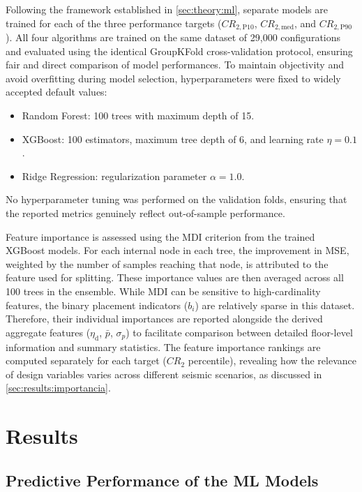 \documentclass[preprint,12pt,authoryear]{elsarticle}
\newcommand{\CR}[1]{CR_{2,\text{#1}}}
\newcommand{\etad}{\eta_{\mathrm{d}}}
\begin{document}
Following the framework established in \cref{sec:theory:ml}, separate models are trained for each of the three performance targets ($\CR{P10}$, $\CR{med}$, and $\CR{P90}$). All four algorithms are trained on the same dataset of 29,000 configurations and evaluated using the identical GroupKFold cross-validation protocol, ensuring fair and direct comparison of model performances. To maintain objectivity and avoid overfitting during model selection, hyperparameters were fixed to widely accepted default values:
\begin{itemize}
	\renewcommand{\labelitemi}{---}
	\item Random Forest: 100 trees with maximum depth of 15.
	\item XGBoost: 100 estimators, maximum tree depth of 6, and learning rate $\eta = 0.1$.
	\item Ridge Regression: regularization parameter $\alpha = 1.0$.
\end{itemize}

No hyperparameter tuning was performed on the validation folds, ensuring that the reported metrics genuinely reflect out-of-sample performance.

Feature importance is assessed using the MDI criterion from the trained XGBoost models. For each internal node in each tree, the improvement in MSE, weighted by the number of samples reaching that node, is attributed to the feature used for splitting. These importance values are then averaged across all 100 trees in the ensemble. While MDI can be sensitive to high-cardinality features, the binary placement indicators ($b_i$) are relatively sparse in this dataset. Therefore, their individual importances are reported alongside the derived aggregate features ($\etad$, $\bar{p}$, $\sigma_p$) to facilitate comparison between detailed floor-level information and summary statistics. The feature importance rankings are computed separately for each target ($CR_2$ percentile), revealing how the relevance of design variables varies across different seismic scenarios, as discussed in \cref{sec:results:importancia}.

\section{Results}
\label{sec:results}

\subsection{Predictive Performance of the ML Models}
\label{sec:results:performance}
\end{document}
